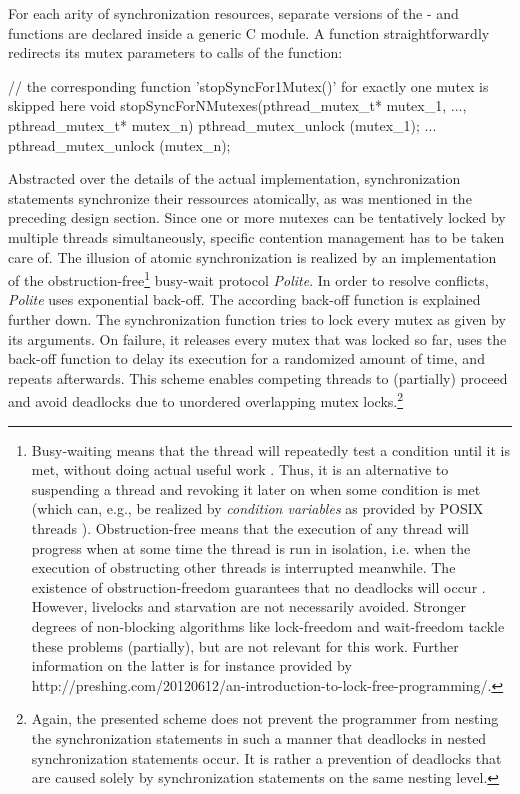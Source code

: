 For each arity of synchronization resources, separate versions of the - and  functions are declared inside a generic C module. A  function straightforwardly redirects its mutex parameters to calls of the  function:
\begin{ccode}
// the corresponding function 'stopSyncFor1Mutex()' for exactly one mutex is skipped here
void stopSyncForNMutexes(pthread_mutex_t* mutex_1, ..., pthread_mutex_t* mutex_n) { 
  pthread_mutex_unlock (mutex_1);
  ...
  pthread_mutex_unlock (mutex_n); 
}
\end{ccode}

Abstracted over the details of the actual implementation, synchronization statements synchronize their ressources atomically, as was mentioned in the preceding design section. Since one or more mutexes can be tentatively locked by multiple threads simultaneously, specific contention management has to be taken care of. The illusion of atomic synchronization is realized by an implementation of the obstruction-free\footnote{Busy-waiting means that the thread will repeatedly test a condition until it is met, without doing actual useful work \cite[p.~166]{AnIntroductionToParallelProgramming}. Thus, it is an alternative to suspending a thread and revoking it later on when some condition is met (which can, e.g., be realized by \textit{condition variables} as provided by POSIX threads \cite[p.~77]{ProgrammingWithPOSIXThreads}). Obstruction-free means that the execution of any thread will progress when at some time the thread is run in isolation, i.e. when the execution of obstructing other threads is interrupted meanwhile. The existence of obstruction-freedom guarantees that no deadlocks will occur \cite{ObstructionFreeAuthorizationEnforcement}. However, livelocks and starvation are not necessarily avoided. Stronger degrees of non-blocking algorithms like lock-freedom and wait-freedom tackle these problems (partially), but are not relevant for this work. Further information on the latter is for instance provided by http://preshing.com/20120612/an-introduction-to-lock-free-programming/. %
} busy-wait protocol \textit{Polite}. In order to resolve conflicts, \textit{Polite} uses exponential back-off. The according back-off function is explained further down. The synchronization function tries to lock every mutex as given by its arguments. On failure, it releases every mutex that was locked so far, uses the back-off function to delay its execution for a randomized amount of time, and repeats afterwards. This scheme enables competing threads to (partially) proceed and avoid deadlocks due to unordered overlapping mutex locks.\footnote{Again, the presented scheme does not prevent the programmer from nesting the synchronization statements in such a manner that deadlocks in nested synchronization statements occur. It is rather a prevention of deadlocks that are caused solely by synchronization statements on the same nesting level.}
